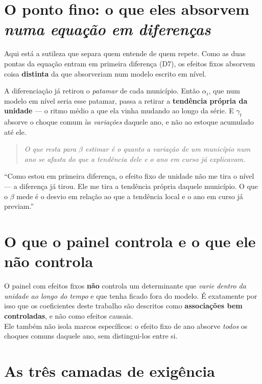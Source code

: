 \section{O ponto fino: o que eles absorvem \emph{numa equação em diferenças}}

Aqui está a sutileza que separa quem entende de quem repete. Como as duas
pontas da equação entram em primeira diferença (D7), os efeitos fixos absorvem
coisa \textbf{distinta} da que absorveriam num modelo escrito em nível.

A diferenciação já retirou o \emph{patamar} de cada município. Então $\alpha_i$,
que num modelo em nível seria esse patamar, passa a retirar a
\textbf{tendência própria da unidade} --- o ritmo médio a que ela vinha mudando
ao longo da série. E $\gamma_t$ absorve o choque comum às \emph{variações}
daquele ano, e não ao estoque acumulado até ele.

\begin{quote}\itshape\color{cortinta}
O que resta para $\beta$ estimar é o quanto a variação de um município num ano
se afasta do que a tendência dele e o ano em curso já explicavam.
\end{quote}

\begin{nabanca}
``Como estou em primeira diferença, o efeito fixo de unidade não me tira o nível
--- a diferença já tirou. Ele me tira a tendência própria daquele município. O
que o $\beta$ mede é o desvio em relação ao que a tendência local e o ano em
curso já previam.''
\end{nabanca}

\section{O que o painel controla e o que ele não controla}

\begin{naodiz}
O painel com efeitos fixos \textbf{não} controla um determinante que
\emph{varie dentro da unidade ao longo do tempo} e que tenha ficado fora do
modelo. É exatamente por isso que os coeficientes deste trabalho são descritos
como \textbf{associações bem controladas}, e não como efeitos causais. \\[4pt]
Ele também não isola marcos específicos: o efeito fixo de ano absorve
\emph{todos} os choques comuns daquele ano, sem distingui-los entre si.
\end{naodiz}

\section{As três camadas de exigência}

